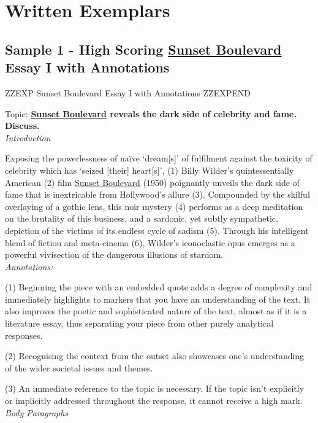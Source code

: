 \documentclass[a4paper]{article}
\begin{document}
\section{Written Exemplars}

\subsection{Sample 1 - High Scoring \underline{Sunset Boulevard} Essay I with Annotations}


ZZEXP Sunset Boulevard Essay I with Annotations ZZEXPEND


Topic:
\textbf{\underline{Sunset Boulevard} reveals the dark side of celebrity and fame. Discuss.}\\

\textit{Introduction}

Exposing the powerlessness of naïve ‘dream[s]’ of fulfilment against the toxicity of celebrity which has ‘seized [their] heart[s]’, (1) Billy Wilder’s quintessentially American (2) film \underline{Sunset Boulevard} (1950) poignantly unveils the dark side of fame that is inextricable from Hollywood’s allure (3). Compounded by the skilful overlaying of a gothic lens, this noir mystery (4) performs as a deep meditation on the brutality of this business, and a sardonic, yet subtly sympathetic, depiction of the victims of its endless cycle of sadism (5). Through his intelligent blend of fiction and meta-cinema (6), Wilder’s iconoclastic opus emerges as a powerful vivisection of the dangerous illusions of stardom.\\

\textit{Annotations:}

(1) Beginning the piece with an embedded quote adds a degree of complexity and immediately highlights to markers that you have an understanding of the text. It also improves the poetic and sophisticated nature of the text, almost as if it is a literature essay, thus separating your piece from other purely analytical responses.

(2) Recognising the context from the outset also showcases one’s understanding of the wider societal issues and themes.

(3) An immediate reference to the topic is necessary. If the topic isn’t explicitly or implicitly addressed throughout the response, it cannot receive a high mark.\\


\textit{Body Paragraphs}
\end{document}
